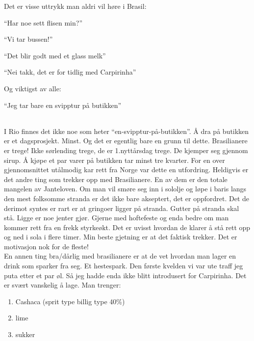 Det er visse uttrykk man aldri vil høre i Brasil:\\
\begin{dialogue}
	\item ``Har noe sett flisen min?''
	\item ``Vi tar bussen!''
	\item ``Det blir godt med et glass melk''
	\item ``Nei takk, det er for tidlig med Carpirinha''\\

	\end{dialogue}
Og viktigst av alle:

\begin{dialogue}
	\item ``Jeg tar bare en svipptur på butikken''
\end{dialogue}\\

I Rio finnes det ikke noe som heter ``en-svipptur-på-butikken''. Å dra på butikken er
et dagsprosjekt. Minst.  Og det er egentlig bare en grunn til dette.
Brasilianere er trege! Ikke sørlending trege, de er 1.nyttårsdag
trege. De kjemper seg gjennom sirup. Å kjøpe et par varer på butikken
tar minst tre kvarter. For en over gjennomsnittet utålmodig kar rett
fra Norge var dette en utfordring.
Heldigvis er det andre ting som trekker opp med Brasilianere. En av
dem er den totale mangelen av Janteloven. Om man vil smøre seg inn i
sololje og løpe i baris langs den mest folksomme stranda er det ikke
bare akseptert, det er oppfordret. Det de derimot syntes er rart er
at gringoer ligger på stranda. Gutter på stranda skal stå.
Ligge er noe jenter gjør. Gjerne med hoftefeste og enda bedre om man kommer rett fra en frekk styrkeøkt. Det er uvisst hvordan de klarer å stå rett opp
og ned i sola i flere timer. Min beste gjetning er at det faktisk
trekker. Det er motivasjon nok for de fleste!\\

En annen ting bra/dårlig med brasilianere er at de vet hvordan man
lager en drink som sparker fra seg. Et hestespark. Den første kvelden
vi var ute traff jeg puta etter et par øl. Så jeg hadde enda ikke
blitt introdusert for Carpirinha.
Det er svært vanskelig å lage. Man trenger:

\begin{enumerate}
	\item Cashaca (sprit type billig type 40\%)
	\item lime 
	\item sukker
\end{enumerate}

